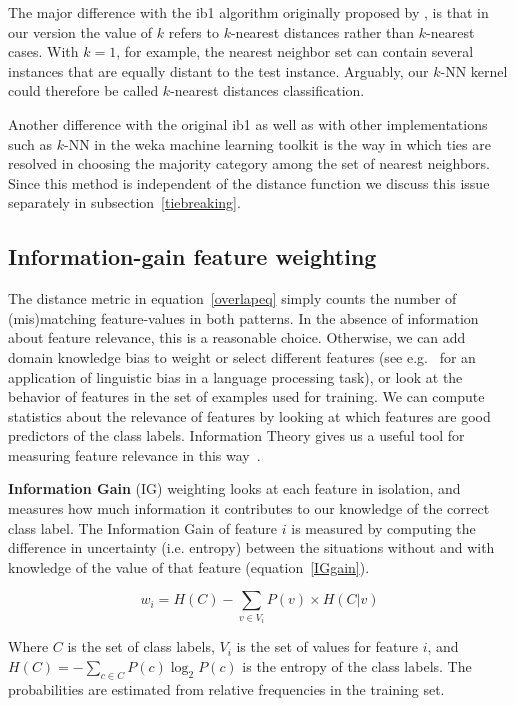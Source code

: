 \documentclass{report}
\begin{document}
The major difference with the {\sc ib1} algorithm originally proposed
by \cite{Aha+91}, is that in our version the value of $k$ refers to
$k$-nearest distances rather than $k$-nearest cases. With $k=1$, for
example, the nearest neighbor set can contain several instances that
are equally distant to the test instance. Arguably, our $k$-NN kernel
could therefore be called $k$-nearest distances classification.

Another difference with the original {\sc ib1} as well as with other
implementations such as $k$-NN in the {\sc weka} machine learning
toolkit \cite{Witten+99} is the way in which ties are resolved in
choosing the majority category among the set of nearest
neighbors. Since this method is independent of the distance function
we discuss this issue separately in subsection~\ref{tiebreaking}.

\subsection{Information-gain feature weighting}
\label{infogain}

The distance metric in equation~\ref{overlapeq} simply counts the
number of (mis)matching feature-values in both patterns. In the
absence of information about feature relevance, this is a reasonable
choice. Otherwise, we can add domain knowledge bias to weight or
select different features (see e.g.~ for an
application of linguistic bias in a language processing task), or look
at the behavior of features in the set of examples used for
training. We can compute statistics about the relevance of features by
looking at which features are good predictors of the class
labels. Information Theory gives us a useful tool for measuring
feature relevance in this way~\cite{Quinlan86,Quinlan93}.

{\bf Information Gain} (IG) weighting looks at each feature in
isolation, and measures how much information it contributes to our
knowledge of the correct class label. The Information Gain of feature
$i$ is measured by computing the difference in uncertainty
(i.e. entropy) between the situations without and with knowledge of
the value of that feature (equation~\ref{IGgain}).

\begin{equation}
w_{i} = H(C) -  \sum_{v \in V_{i}} P(v) \times H(C|v)
\label{IGgain}
\end{equation}

Where $C$ is the set of class labels, $V_{i}$ is the set of values for
feature $i$, and $H(C) = - \sum_{c \in C} P(c) \log_{2} P(c)$ is the
entropy of the class labels. The probabilities are estimated from
relative frequencies in the training set. 
\end{document}

